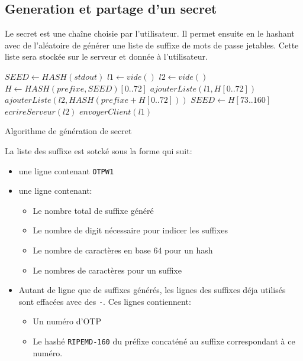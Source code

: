 \documentclass{../res/univ-projet}
\begin{document}
\subsection{Generation et partage d'un secret}
Le secret est une chaîne choisie par l'utilisateur. Il permet ensuite
en le hashant avec de l'aléatoire de générer une liste de suffixe de mots de
passe jetables. Cette liste sera stockée sur le serveur et donnée à
l'utilisateur.
\begin{algorithm}
    \label{gen}
    \begin{algorithmic}
        \STATE $SEED \leftarrow HASH(stdout)$
        \STATE $l1 \leftarrow vide()$
        \STATE $l2 \leftarrow vide()$
        \STATE $H \leftarrow HASH(prefixe, SEED)[0..72]$
        \STATE $ajouterListe(l1, H[0..72])$
        \STATE $ajouterListe(l2, HASH(prefixe + H[0..72]))$
        \STATE $SEED \leftarrow H[73..160]$
        \ENDFOR
        \STATE $ecrireServeur(l2)$
        \STATE $envoyerClient(l1)$
    \end{algorithmic}
    \caption{Algorithme de génération de secret}
\end{algorithm}

La liste des suffixe est sotcké sous la forme qui suit:
\begin{itemize}
    \item une ligne contenant \verb?OTPW1?
    \item une ligne contenant:
        \begin{itemize}
            \item Le nombre total de suffixe généré
            \item Le nombre de digit nécessaire pour indicer les suffixes
            \item Le nombre de caractères en base 64 pour un hash
            \item Le nombres de caractères pour un suffixe
        \end{itemize}
    \item Autant de ligne que de suffixes générés, les lignes des
        suffixes déja utilisés sont effacées avec des \verb?-?.
        Ces lignes contiennent:
        \begin{itemize}
            \item Un num\'ero d'OTP
            \item Le hash\'e \verb?RIPEMD-160? du pr\'efixe concat\'en\'e
                au suffixe correspondant à ce num\'ero.
        \end{itemize}
\end{itemize}
\end{document}
